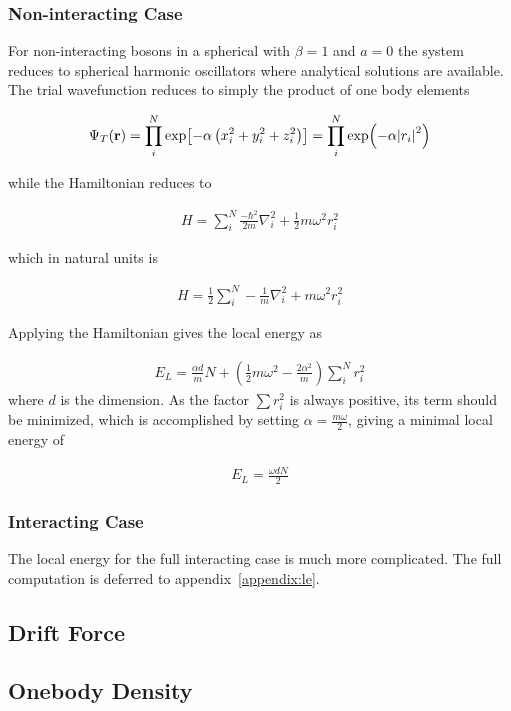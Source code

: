 \subsubsection{Non-interacting Case}
For non-interacting bosons in a spherical with \(\beta = 1\) and \(a = 0\) the
system reduces to spherical harmonic oscillators where analytical solutions are
available. The trial wavefunction reduces to simply the product of one body
elements

\newcommand{\psit}{\Psi_T(\vb{r})}
\newcommand{\onebody}{\prod_{i}^{N}\exp{-\alpha\left[\left( x_i^2 + y_i^2 + \beta
      z_i^2\right)\right]}}
\begin{align*}
  \psit = \prod_{i}^{N}\exp[-\alpha\left( x_{i}^{2}+y_{i}^{2}+z_{i}^{2} \right)] = \prod_{i}^{N}\exp(-\alpha \abs{r_{i}}^{2})
\end{align*}

while the Hamiltonian reduces to

\begin{align*}
  H = \sum_{i}^{N} \frac{-\hbar^{2}}{2m}\nabla_{i}^{2} + \frac{1}{2}m\omega^{2}r_{i}^{2}
\end{align*}

which in natural units is

\newcommand{\lapl}[1]{\nabla_{#1}^2}
\begin{align*}
  H = \frac{1}{2}\sum_{i}^{N} -\frac{1}{m}\lapl{i} + m\omega^{2}r_{i}^{2}
\end{align*}

Applying the Hamiltonian gives the local energy as

\begin{align*}
  E_{L} = \frac{\alpha d}{m} N + \left( \frac{1}{2}m\omega^{2} - \frac{2\alpha^{2}}{m} \right)\sum_{i}^{N}r_{i}^{2}
\end{align*}
 where \(d\) is the dimension. As the factor \(\sum r_{i}^{2}\) is always
 positive, its term should be minimized, which is accomplished by setting
 \(\alpha = \frac{m\omega}{2}\), giving a minimal local energy of

 \begin{align*}
   E_{L} = \frac{\omega d N}{2}
   \end{align*}

\subsubsection{Interacting Case}
The local energy for the full interacting case is much more complicated. The
full computation is deferred to appendix~\ref{appendix:le}.





\subsection{Drift Force}
\subsection{Onebody Density}

